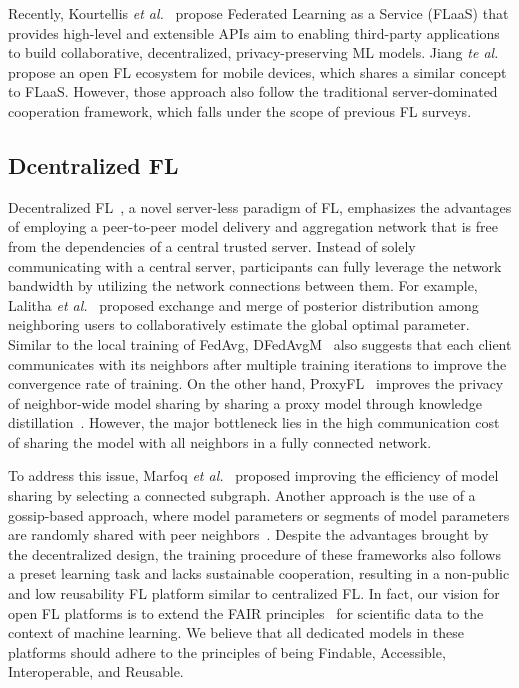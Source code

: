 \documentclass[journal]{IEEEtran}
\begin{document}
Recently, Kourtellis \textit{et al.}~\cite{kourtellis2020flaas} propose Federated Learning as a Service (FLaaS) that provides high-level and extensible APIs aim to enabling third-party applications to build collaborative, decentralized, privacy-preserving ML models.
Jiang \textit{te al.}~\cite{jiang2022flsys} propose an open FL ecosystem for mobile devices, which shares a similar concept to FLaaS.
However, those approach also follow the traditional server-dominated cooperation framework, which falls under the scope of previous FL surveys\cite{yang2019federated, li2020federated,kairouz2021advances}.

\subsection{Dcentralized FL}
Decentralized FL~\cite{lalitha2018fully, kalra2023decentralized, marfoq2020throughput, hu2019decentralized, sun2022decentralized, shi2023improving}, a novel server-less paradigm of FL, emphasizes the advantages of employing a peer-to-peer model delivery and aggregation network that is free from the dependencies of a central trusted server.
Instead of solely communicating with a central server, participants can fully leverage the network bandwidth by utilizing the network connections between them.
For example, Lalitha \textit{et al.}~\cite{lalitha2018fully} proposed exchange and merge of posterior distribution among neighboring users to collaboratively estimate the global optimal parameter.
Similar to the local training of FedAvg, DFedAvgM~\cite{sun2022decentralized} also suggests that each client communicates with its neighbors after multiple training iterations to improve the convergence rate of training.
On the other hand, ProxyFL~\cite{kalra2023decentralized} improves the privacy of neighbor-wide model sharing by sharing a proxy model through knowledge distillation~\cite{hinton2015distilling}.
However, the major bottleneck lies in the high communication cost of sharing the model with all neighbors in a fully connected network. 

To address this issue, Marfoq \textit{et al.}~\cite{marfoq2020throughput} proposed improving the efficiency of model sharing by selecting a connected subgraph.
Another approach is the use of a gossip-based approach, where model parameters or segments of model parameters are randomly shared with peer neighbors~\cite{hegedHus2021decentralized, hu2019decentralized, shi2023improving}.
Despite the advantages brought by the decentralized design, the training procedure of these frameworks also follows a preset learning task and lacks sustainable cooperation, resulting in a non-public and low reusability FL platform similar to centralized FL.
In fact, our vision for open FL platforms is to extend the FAIR principles~\cite{wilkinson2016fair} for scientific data to the context of machine learning.
We believe that all dedicated models in these platforms should adhere to the principles of being Findable, Accessible, Interoperable, and Reusable.
\end{document}
